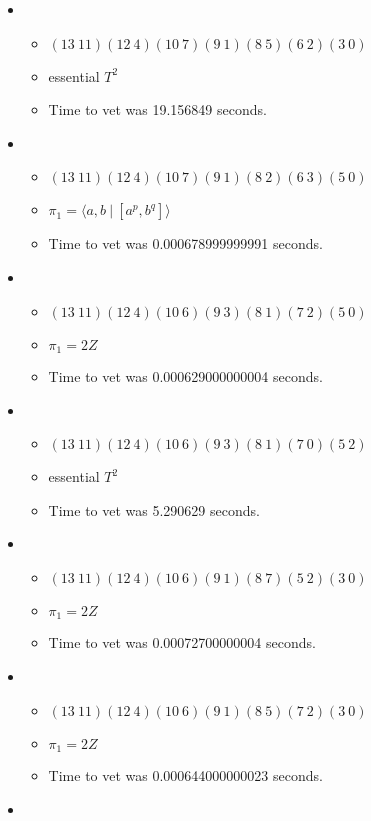 \documentclass{article}
\begin{document}
\begin{itemize}
\item \begin{itemize}
      \item $(13\ 11)(12\ 4)(10\ 7)(9\ 1)(8\ 5)(6\ 2)(3\ 0)$
      \item essential $T^2$
      \item Time to vet was 19.156849 seconds.
\end{itemize}
\item \begin{itemize}
      \item $(13\ 11)(12\ 4)(10\ 7)(9\ 1)(8\ 2)(6\ 3)(5\ 0)$
      \item $\pi_1 = \langle a,b\ |\ [a^p,b^q]\rangle$
      \item Time to vet was 0.000678999999991 seconds.
\end{itemize}
\item \begin{itemize}
      \item $(13\ 11)(12\ 4)(10\ 6)(9\ 3)(8\ 1)(7\ 2)(5\ 0)$
      \item $\pi_1 =2 Z$
      \item Time to vet was 0.000629000000004 seconds.
\end{itemize}
\item \begin{itemize}
      \item $(13\ 11)(12\ 4)(10\ 6)(9\ 3)(8\ 1)(7\ 0)(5\ 2)$
      \item essential $T^2$
      \item Time to vet was 5.290629 seconds.
\end{itemize}
\item \begin{itemize}
      \item $(13\ 11)(12\ 4)(10\ 6)(9\ 1)(8\ 7)(5\ 2)(3\ 0)$
      \item $\pi_1 =2 Z$
      \item Time to vet was 0.00072700000004 seconds.
\end{itemize}
\item \begin{itemize}
      \item $(13\ 11)(12\ 4)(10\ 6)(9\ 1)(8\ 5)(7\ 2)(3\ 0)$
      \item $\pi_1 =2 Z$
      \item Time to vet was 0.000644000000023 seconds.
\end{itemize}
\item \begin{itemize}

\end{itemize}
\end{itemize}
\end{document}
